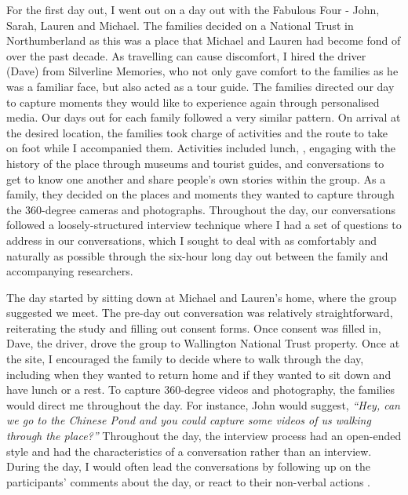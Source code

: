 For the first day out, I went out on a day out with the Fabulous Four - John, Sarah, Lauren and Michael. The families decided on a National Trust  in Northumberland as this was a place that Michael and Lauren had become fond of over the past decade. As travelling can cause discomfort, I hired the driver (Dave) from Silverline Memories, who not only gave comfort to the families as he was a familiar face, but also acted as a tour guide. The families directed our day to capture moments they would like to experience again through personalised media. Our days out for each family followed a very similar pattern. On arrival at the desired location, the families took charge of activities and the route to take on foot while I accompanied them. Activities included lunch, , engaging with the history of the place through museums and tourist guides, and conversations to get to know one another and share people's own stories within the group. As a family, they decided on the places and moments they wanted to capture through the 360-degree cameras and photographs. Throughout the day, our conversations followed a loosely-structured interview technique where I had a set of questions to address in our conversations, which I sought to deal with as comfortably and naturally as possible through the six-hour long day out between the family and accompanying researchers.

The day started by sitting down at Michael and Lauren's home, where the group suggested we meet. The pre-day out conversation was relatively straightforward, reiterating the study and filling out consent forms. Once consent was filled in, Dave, the driver, drove the group to Wallington National Trust property. Once at the site, I encouraged the family to decide where to walk through the day, including when they wanted to return home and if they wanted to sit down and have lunch or a rest. To capture 360-degree videos and photography, the families would direct me throughout the day. For instance, John would suggest, \textit{``Hey, can we go to the Chinese Pond and you could capture some videos of us walking through the place?''} Throughout the day, the interview process had an open-ended style and had the characteristics of a conversation rather than an interview. During the day, I would often lead the conversations by following up on the participants' comments about the day, or react to their non-verbal actions .


